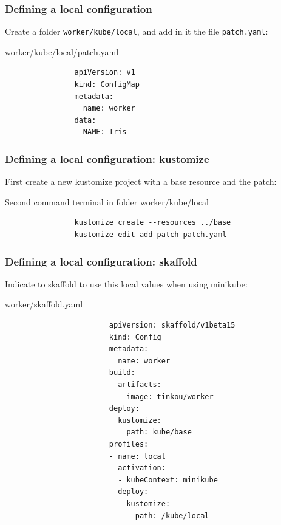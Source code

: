 	\begin{frame}[fragile]
		\frametitle{Defining a local configuration}
		
		Create a folder \verb!worker/kube/local!, and add in it the file \verb!patch.yaml!:
		\begin{block}{worker/kube/local/patch.yaml}
			\begin{verbatim}
				apiVersion: v1
				kind: ConfigMap
				metadata:
				  name: worker
				data:
				  NAME: Iris
			\end{verbatim}
		\end{block}
		
		\medskip
		
	\end{frame}
	
	\begin{frame}[fragile]
		\frametitle{Defining a local configuration: kustomize}
		
		First create a new kustomize project with a base resource and the patch:
		\begin{block}{Second command terminal in folder worker/kube/local}
			\begin{verbatim}
				kustomize create --resources ../base
				kustomize edit add patch patch.yaml
			\end{verbatim}
		\end{block}
		
	\end{frame}
	
	\begin{frame}[fragile]
		\frametitle{Defining a local configuration: skaffold}
		
		Indicate to skaffold to use this local values when using minikube:
		\begin{block}{worker/skaffold.yaml}
			\begin{tiny}
				\begin{verbatim}
						apiVersion: skaffold/v1beta15
						kind: Config
						metadata:
						  name: worker
						build:
						  artifacts:
						  - image: tinkou/worker
						deploy:
						  kustomize:
						    path: kube/base
						profiles:
						- name: local
						  activation:
						  - kubeContext: minikube
						  deploy:
						    kustomize:
						      path: /kube/local
				\end{verbatim}
			\end{tiny}
		\end{block}
	
	\end{frame}
	
